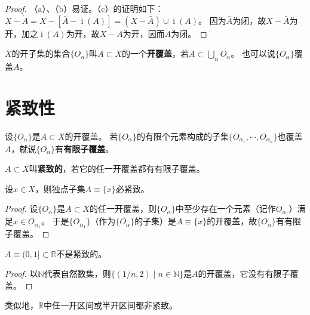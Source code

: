 \begin{proof}
	（a）、（b）易证。（c）的证明如下：
	$X - \dot{A} = X - [\bar{A} - \operatorname{i}(A)] = (X - \bar{A}) \cup \operatorname{i}(A)$。
	因为$\bar{A}$为闭，故$X - \bar{A}$为开，加之$\operatorname{i}(A)$为开，故$X - \dot{A}$为开，因而$\dot{A}$为闭。
\end{proof}

\begin{definition}
	$X$的开子集的集合$\{O_\alpha\}$叫$A \subset X$的一个\textbf{开覆盖}，若$A \subset \bigcup\limits_\alpha O_\alpha$。
	也可以说$\{O_\alpha\}$覆盖$A$。
\end{definition}

\section{紧致性}

\begin{definition}
	设$\{O_\alpha\}$是$A \subset X$的开覆盖。
	若$\{O_\alpha\}$的有限个元素构成的子集$\{O_{\alpha_1}, \cdots, O_{\alpha_n}\}$也覆盖$A$，就说$\{O_\alpha\}$有\textbf{有限子覆盖}。
\end{definition}

\begin{definition}
	$A \subset X$叫\textbf{紧致的}，若它的任一开覆盖都有有限子覆盖。
\end{definition}

\begin{example}
	设$x \in X$，则独点子集$A \equiv \{x\}$必紧致。
\end{example}

\begin{proof}
	设$\{O_\alpha\}$是$A \subset X$的任一开覆盖，则$\{O_\alpha\}$中至少存在一个元素（记作$O_{\alpha_1}$）满足$x \in O_{\alpha_1}$。
	于是$\{O_{\alpha_1}\}$（作为$\{O_\alpha\}$的子集）是$A \equiv \{x\}$的开覆盖，故$\{O_\alpha\}$有有限子覆盖。
\end{proof}

\begin{example}
	$A \equiv (0, 1] \subset \mathbb{R}$不是紧致的。
\end{example}

\begin{proof}
	以$\mathbb{N}$代表自然数集，则$\{(1/n, 2) \mid n \in \mathbb{N}\}$是$A$的开覆盖，它没有有限子覆盖。
\end{proof}

类似地，$\mathbb{R}$中任一开区间或半开区间都非紧致。

